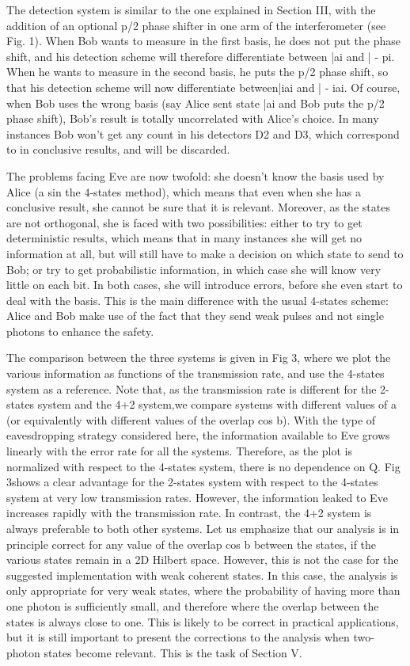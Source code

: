 The detection system is similar to the one explained in Section III, with the addition of an optional p/2 phase shifter in one arm of the interferometer (see Fig. 1). When Bob wants to measure in the first basis, he does not put the phase shift, and his detection scheme will therefore differentiate between |ai and | - pi. When he wants to measure in the second basis, he puts the p/2 phase shift, so that his detection scheme will now differentiate between|iai and | - iai. Of course, when Bob uses the wrong basis (say Alice sent state |ai and Bob puts the p/2 phase shift), Bob’s result is totally uncorrelated with Alice’s choice. In many instances Bob won’t get any count in his detectors D2 and D3, which correspond to in conclusive results, and will be discarded.

The problems facing Eve are now twofold: she doesn’t know the basis used by Alice (a sin the 4-states method), which means that even when she has a conclusive result, she cannot be sure that it is relevant. Moreover, as the states are not orthogonal, she is faced with two possibilities: either to try to get deterministic results, which means that in many instances she will get no information at all, but will still have to make a decision on which state to send to Bob; or try to get probabilistic information, in which case she will know very little on each bit. In both cases, she will introduce errors, before she even start to deal with the basis. This is the main difference with the usual 4-states scheme: Alice and Bob make use of the fact that they send weak pulses and not single photons to enhance the safety.

The comparison between the three systems is given in Fig 3, where we plot the various information as functions of the transmission rate, and use the 4-states system as a reference. Note that, as the transmission rate is different for the 2-states system and the 4+2 system,we compare systems with different values of a (or equivalently with different values of the overlap cos b). With the type of eavesdropping strategy considered here, the information available to Eve grows linearly with the error rate for all the systems. Therefore, as the plot is normalized with respect to the 4-states system, there is no dependence on Q. Fig 3shows a clear advantage for the 2-states system with respect to the 4-states system at very low transmission rates. However, the information leaked to Eve increases rapidly with the transmission rate. In contrast, the 4+2 system is always preferable to both other systems. Let us emphasize that our analysis is in principle correct for any value of the overlap cos b between the states, if the various states remain in a 2D Hilbert space. However, this is not the case for the suggested implementation with weak coherent states. In this case, the analysis is only appropriate for very weak states, where the probability of having more than one photon is sufficiently small, and therefore where the overlap between the states is always close to one. This is likely to be correct in practical applications, but it is still important to present the corrections to the analysis when two-photon states become relevant. This is the task of Section V.

